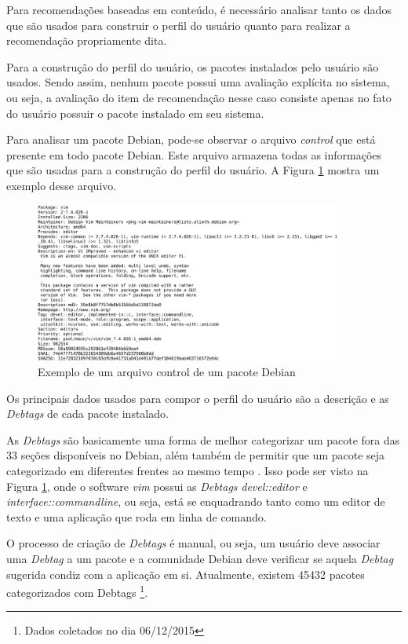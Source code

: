 Para recomendações baseadas em conteúdo, é necessário analisar tanto os dados
que são usados para construir o perfil do usuário quanto para realizar a
recomendação propriamente dita.

Para a construção do perfil do usuário, os pacotes instalados pelo usuário são
usados. Sendo assim, nenhum pacote possui uma avaliação explícita no sistema,
ou seja, a avaliação do item de recomendação nesse caso consiste apenas no fato
do usuário possuir o pacote instalado em seu sistema.

Para analisar um pacote Debian, pode-se observar o arquivo \textit{control} que
está presente em todo pacote Debian. Este arquivo
armazena todas as informações que são usadas para a construção do perfil do
usuário. A Figura \ref{fig:control_pacote} mostra um exemplo desse arquivo.

\begin{figure}[h]
  \centering
  \includegraphics[width=0.9\textwidth]{figuras/control_pacote.eps}
  \caption{Exemplo de um arquivo control de um pacote Debian}
  \label{fig:control_pacote}
\end{figure}

Os principais dados usados para compor o perfil do usuário são a
descrição e as \textit{Debtags} de cada pacote instalado.

As \textit{Debtags} são basicamente uma forma de melhor categorizar um pacote fora das 33
seções disponíveis no Debian, além também de permitir que um pacote seja
categorizado em diferentes frentes ao mesmo tempo \cite{zini2005cute}. Isso pode ser visto na Figura
\ref{fig:control_pacote}, onde o software \textit{vim} possui as
\textit{Debtags} \textit{devel::editor} e \textit{interface::commandline}, ou seja, está se
enquadrando tanto como um editor de texto e uma aplicação que roda em linha de
comando.

O processo de criação de \textit{Debtags} é manual, ou seja, um usuário deve associar uma
\textit{Debtag} a um pacote e a comunidade Debian deve verificar se aquela
\textit{Debtag} sugerida condiz com a aplicação em si. Atualmente, existem 45432 pacotes
categorizados com Debtags \footnote{Dados coletados no dia 06/12/2015}.


